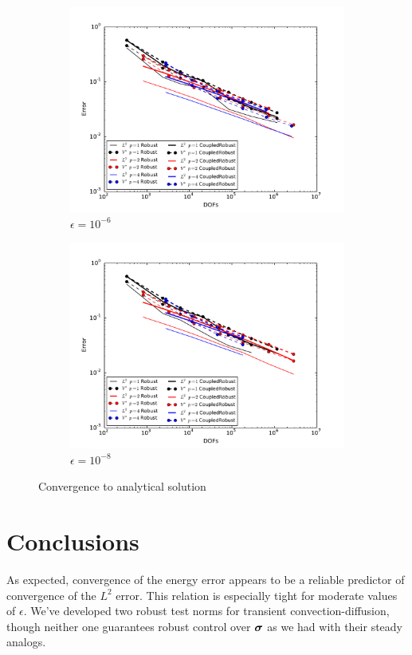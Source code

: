 \documentclass{article}
\theoremstyle{definition}
\theoremstyle{remark}
\begin{document}
\begin{figure}[ht]
\begin{subfigure}[t]{0.45\textwidth}
\includegraphics[width=\textwidth]{Confusion/Robustness/convergence_epsilon=1e-6.pdf}
\caption{$\epsilon=10^{-6}$}
\end{subfigure}
\begin{subfigure}[t]{0.45\textwidth}
\centering
\includegraphics[width=\textwidth]{Confusion/Robustness/convergence_epsilon=1e-8.pdf}
\caption{$\epsilon=10^{-8}$}
\end{subfigure}
\caption{Convergence to analytical solution}
\label{fig:robustConvergence}
\end{figure}


\section{Conclusions}
As expected, convergence of the energy error appears to be a reliable predictor of convergence of the $L^2$ error. 
This relation is especially tight for moderate values of $\epsilon$. 
We've developed two robust test norms for transient convection-diffusion, though neither one guarantees robust control over $\boldsymbol\sigma$ as we had
with their steady analogs. 

 

\end{document}
